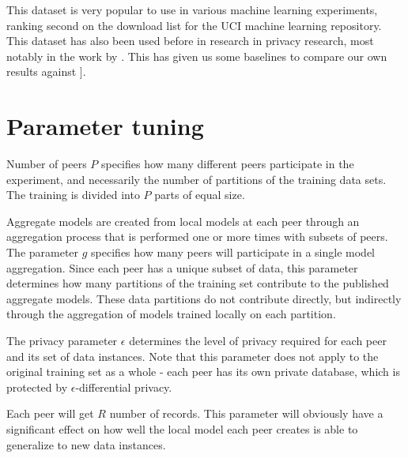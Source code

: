 This dataset is very popular to use in various machine learning experiments, ranking second on the download list for the UCI machine learning repository. This dataset has also been used before in research in privacy research, most notably in the work by \cite{pathak2010diffprivhomo}. This has given us some baselines to compare our own results against ].

\section{Parameter tuning}
\label{sec:parameter_tuning}
Number of peers $P$ specifies how many different peers participate in the experiment, and necessarily the number of partitions of the training data sets. The training is divided into $P$ parts of equal size.


Aggregate models are created from local models at each peer through an aggregation process that is performed one or more times with subsets of peers. The parameter $g$ specifies how many peers will participate in a single model aggregation. Since each peer has a unique subset of data, this parameter determines how many partitions of the training set contribute to the published aggregate models. These data partitions do not contribute directly, but indirectly through the aggregation of models trained locally on each partition.

The privacy parameter $\epsilon$ determines the level of privacy required for each peer and its set of data instances. Note that this parameter does not apply to the original training set as a whole - each peer has its own private database, which is protected by $\epsilon$-differential privacy. 

Each peer will get $R$ number of records. This parameter will obviously have a significant effect on how well the local model each peer creates is able to generalize to new data instances. 

